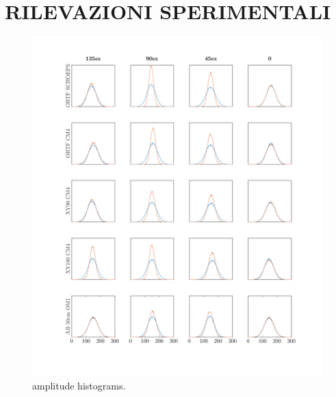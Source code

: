 \clearpage
\section*{RILEVAZIONI SPERIMENTALI}

%

\begin{figure}[t]
  \centering
  \includegraphics[width=.97\textwidth]{img/statistiche/pdf/amplitude_histograms_1}
  \caption{amplitude histograms.}
  \label{amphist1}
  \end{figure}

